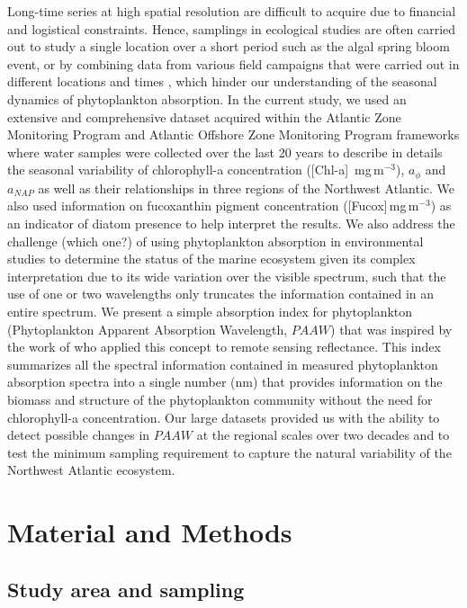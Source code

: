 \documentclass[utf8]{frontiersSCNS} %
\begin{document}
Long-time series at high spatial resolution are difficult to acquire due to financial and logistical constraints. Hence, samplings in ecological studies are often carried out to study a single location over a short period such as the algal spring bloom event, or by combining data from various field campaigns that were carried out in different locations and times \citep{bricaud2004,devred2006}, which hinder our understanding of the seasonal dynamics of phytoplankton absorption. In the current study, we used an extensive and comprehensive dataset acquired within the Atlantic Zone Monitoring Program \citep[AZMP][]{casault2020} and Atlantic Offshore Zone Monitoring Program \citep[AZOMP][]{yashayaev2019} frameworks where water samples were collected over the last 20 years to describe in details the seasonal variability of chlorophyll-a concentration ([Chl-a] \,mg\,m$^{-3}$), $a_\phi$ and $a_{NAP}$ as well as their relationships in three regions of the Northwest Atlantic. We also used information on fucoxanthin pigment concentration ([Fucox]\,mg\,m$^{-3}$) as an indicator of diatom presence to help interpret the results. We also address the challenge (which one?) of using phytoplankton absorption in environmental studies to determine the status of the marine ecosystem given its complex interpretation due to its wide variation over the visible spectrum, such that the use of one or two wavelengths only truncates the information contained in an entire spectrum. We present a simple absorption index for phytoplankton (Phytoplankton Apparent Absorption Wavelength, $PAAW$) that was inspired by the work of \citep{Vermeulen2020} who applied this concept to remote sensing reflectance. This index summarizes all the spectral information contained in measured phytoplankton absorption spectra into a single number (nm) that provides information on the biomass and structure of the phytoplankton community without the need for chlorophyll-a concentration. Our large datasets provided us with the ability to detect possible changes in $PAAW$ at the regional scales over two decades and to test the minimum sampling requirement to capture the natural variability of the Northwest Atlantic ecosystem. 

\section{Material and Methods}

\subsection{Study area and sampling}
\end{document}
